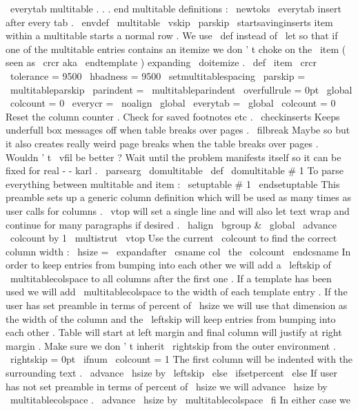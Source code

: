 {{{{\
everytab
}
%
%
multitable
.
.
.
end
multitable
definitions
:
%
\
newtoks
\
everytab
%
insert
after
every
tab
.
%
\
envdef
\
multitable
{
%
\
vskip
\
parskip
\
startsavinginserts
%
%
item
within
a
multitable
starts
a
normal
row
.
%
We
use
\
def
instead
of
\
let
so
that
if
one
of
the
multitable
entries
%
contains
an
itemize
we
don
'
t
choke
on
the
\
item
(
seen
as
\
crcr
aka
%
\
endtemplate
)
expanding
\
doitemize
.
\
def
\
item
{
\
crcr
}
%
%
\
tolerance
=
9500
\
hbadness
=
9500
\
setmultitablespacing
\
parskip
=
\
multitableparskip
\
parindent
=
\
multitableparindent
\
overfullrule
=
0pt
\
global
\
colcount
=
0
%
\
everycr
=
{
%
\
noalign
{
%
\
global
\
everytab
=
{
}
%
\
global
\
colcount
=
0
%
Reset
the
column
counter
.
%
Check
for
saved
footnotes
etc
.
\
checkinserts
%
Keeps
underfull
box
messages
off
when
table
breaks
over
pages
.
%
\
filbreak
%
Maybe
so
but
it
also
creates
really
weird
page
breaks
when
the
%
table
breaks
over
pages
.
Wouldn
'
t
\
vfil
be
better
?
Wait
until
the
%
problem
manifests
itself
so
it
can
be
fixed
for
real
-
-
karl
.
}
%
}
%
%
\
parsearg
\
domultitable
}
\
def
\
domultitable
#
1
{
%
%
To
parse
everything
between
multitable
and
item
:
\
setuptable
#
1
\
endsetuptable
%
%
This
preamble
sets
up
a
generic
column
definition
which
will
%
be
used
as
many
times
as
user
calls
for
columns
.
%
\
vtop
will
set
a
single
line
and
will
also
let
text
wrap
and
%
continue
for
many
paragraphs
if
desired
.
\
halign
\
bgroup
&
%
\
global
\
advance
\
colcount
by
1
\
multistrut
\
vtop
{
%
%
Use
the
current
\
colcount
to
find
the
correct
column
width
:
\
hsize
=
\
expandafter
\
csname
col
\
the
\
colcount
\
endcsname
%
%
In
order
to
keep
entries
from
bumping
into
each
other
%
we
will
add
a
\
leftskip
of
\
multitablecolspace
to
all
columns
after
%
the
first
one
.
%
%
If
a
template
has
been
used
we
will
add
\
multitablecolspace
%
to
the
width
of
each
template
entry
.
%
%
If
the
user
has
set
preamble
in
terms
of
percent
of
\
hsize
we
will
%
use
that
dimension
as
the
width
of
the
column
and
the
\
leftskip
%
will
keep
entries
from
bumping
into
each
other
.
Table
will
start
at
%
left
margin
and
final
column
will
justify
at
right
margin
.
%
%
Make
sure
we
don
'
t
inherit
\
rightskip
from
the
outer
environment
.
\
rightskip
=
0pt
\
ifnum
\
colcount
=
1
%
The
first
column
will
be
indented
with
the
surrounding
text
.
\
advance
\
hsize
by
\
leftskip
\
else
\
ifsetpercent
\
else
%
If
user
has
not
set
preamble
in
terms
of
percent
of
\
hsize
%
we
will
advance
\
hsize
by
\
multitablecolspace
.
\
advance
\
hsize
by
\
multitablecolspace
\
fi
%
In
either
case
we
}}}}}
